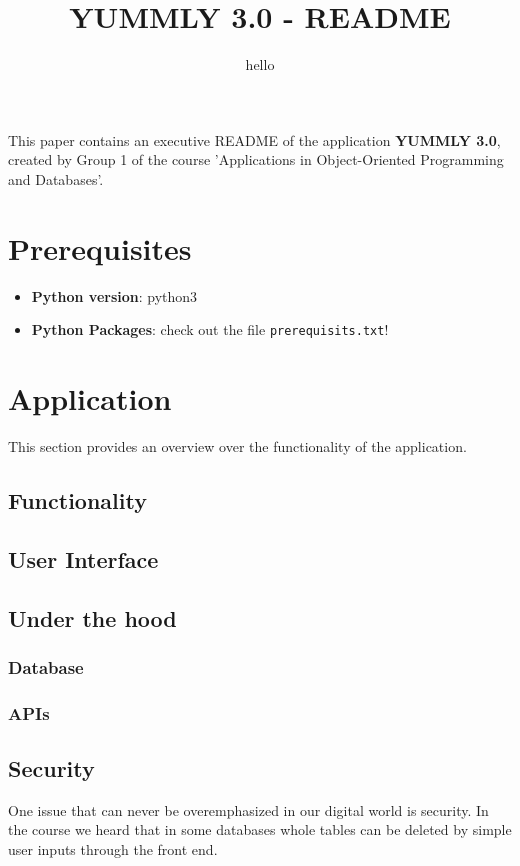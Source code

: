 \documentclass[11pt,a4paper,notitlepage]{article}
\title{YUMMLY 3.0 -  README}
\subtitle{hello}
\date{\vspace{-5ex}}
\author{\vspace{-5ex}}
\begin{document}
\maketitle
\thispagestyle{fancy}

This paper contains an executive README of the application \textbf{ YUMMLY 3.0}, created by Group 1 of the course 'Applications in Object-Oriented Programming and Databases'.

\section*{Prerequisites}
\begin{itemize}  
\item\textbf{Python version}: python3
\item \textbf{Python Packages}: check out the file \texttt{prerequisits.txt}!
\end{itemize}
 
\section*{Application}
This section provides an overview over the functionality of the application.
\subsection*{Functionality}
\subsection*{User Interface}
\subsection*{Under the hood}
\subsubsection*{Database}
\subsubsection*{APIs}
\subsection*{Security}
One issue that can never be overemphasized in our digital world is security. In the course we heard that in some databases whole tables can be deleted by simple user inputs through the front end. \par
\end{document}
